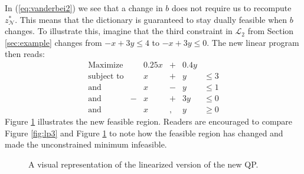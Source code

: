 In (\ref{eq:vanderbei2}) we see that a change in $b$ does not require us to
recompute $z_{\mathcal{N}}^*$.
This means that the dictionary is guaranteed to stay dually feasible when $b$
changes.
To illustrate this, imagine that the third constraint in $\mathcal{L}_2$ from
Section \ref{sec:example} changes from $-x + 3y \leq 4$ to
$-x + 3y \leq 0$. The new linear program then reads:
\[
\begin{array}{lcrcrl}
    \textrm{Maximize}   & & 0.25 x &+& 0.4 y & \\
    \textrm{subject to} & &      x &+&     y & \leq 3 \\
    \textrm{and}        & &      x &-&     y & \leq 1 \\
    \textrm{and}        &-&      x &+&   3 y & \leq 0 \\
    \textrm{and}        & &      x &,&     y & \geq 0
\end{array}
\]
Figure \ref{fig:prac1} illustrates the new feasible region.
Readers are encouraged to compare Figure \ref{fig:lp3} and Figure
\ref{fig:prac1} to note how the feasible region has changed and made the
unconstrained minimum infeasible.

\begin{figure}[ht!]
\centering

\caption{A visual representation of the linearized version of the new QP.}
\label{fig:prac1}
\end{figure}

